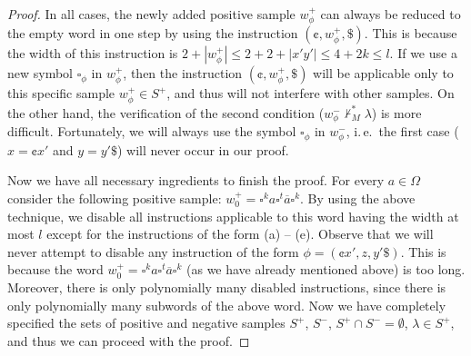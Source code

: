 \begin{proof}
In all cases, the newly added positive
sample $w_{\phi}^+$ can always be reduced to the empty word in one step
by using the instruction $(\cent, w_{\phi}^+, \$)$. This is because the 
width of this instruction is $2 + |w_{\phi}^+| \le 2 + 2 + |x'y'| \le 4 + 2k \le l$.
If we use a new symbol $\square_{\phi}$ in $w_{\phi}^+$,
then the instruction $(\cent, w_{\phi}^+, \$)$ will be applicable only to this
specific sample $w_{\phi}^+ \in S^+$, and thus will not interfere 
with other samples. On the other hand, the verification of the second 
condition ($w_{\phi}^- \not\vdash_M^* \lambda$) is more difficult. 
Fortunately, we will always use the symbol $\square_{\phi}$ in 
$w_{\phi}^-$, i.\,e.\ the first case ($x = \cent x'$ and $y = y' \$$) 
will never occur in our proof.

Now we have all necessary ingredients to finish the proof.
For every $a \in \Omega$ consider the following 
positive sample:
$w_0^+ = \square^k a \square^t \overline{a} \square^k$.
By using the above technique, we disable all instructions
applicable to this word having the width at most $l$ 
except for the instructions of the form (a) -- (e). 
Observe that we will never attempt to disable
any instruction of the form $\phi = (\cent x', z, y' \$)$.
This is because the word 
$w_0^+ = \square^k a \square^t \overline{a} \square^k$
(as we have already mentioned above) is too long.
Moreover, there is only polynomially many
disabled instructions, since there is only polynomially
many subwords of the above word.
Now we have completely specified the sets of positive 
and negative samples $S^+$, $S^-$, $S^+ \cap S^- = \emptyset$,
$\lambda \in S^+$, and thus we can proceed with the proof.


\end{proof}
